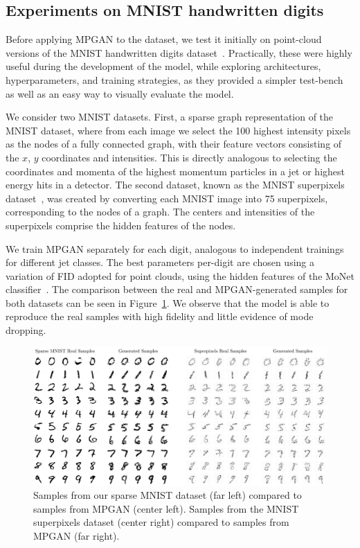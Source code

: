 \subsection{Experiments on MNIST handwritten digits}
\label{sec:04_mpgan_mnist}

Before applying MPGAN to the \jetnet dataset, we test it initially on point-cloud versions of the MNIST handwritten digits dataset~\cite{deng2012mnist}.
Practically, these were highly useful during the development of the model, while exploring architectures, hyperparameters, and training strategies, as they provided a simpler test-bench as well as an easy way to visually evaluate the model.

We consider two MNIST datasets.
First, a sparse graph representation of the MNIST dataset, where from each image we select the 100 highest intensity pixels as the nodes of a fully connected graph, with their feature vectors consisting of the $x$, $y$ coordinates and intensities. 
This is directly analogous to selecting the coordinates and momenta of the highest momentum particles in a jet or highest energy hits in a detector.
The second dataset, known as the MNIST superpixels dataset~\cite{monti2017geometric}, was created by converting each MNIST image into 75 superpixels, corresponding to the nodes of a graph. 
The centers and intensities of the superpixels comprise the hidden features of the nodes.

We train MPGAN separately for each digit, analogous to independent trainings for different jet classes.
The best parameters per-digit are chosen using a variation of FID adopted for point clouds, using the hidden features of the MoNet classifier~\cite{monti2017geometric}.
The comparison between the real and MPGAN-generated samples for both datasets can be seen in Figure~\ref{fig:04_mpgan_mnist}.
We observe that the model is able to reproduce the real samples with high fidelity and little evidence of mode dropping.

\begin{figure}[ht]
    \centering
    \includegraphics[width=\textwidth]{figures/04-ML4Sim/mpgan/real_gen.pdf}
    \caption{Samples from our sparse MNIST dataset (far left) compared to samples from MPGAN (center left). 
    Samples from the MNIST superpixels dataset (center right) compared to samples from MPGAN (far right).\label{fig:04_mpgan_mnist}}
\end{figure}


